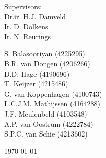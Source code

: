 \begin{titlepage}
\begin{center}
Supervisors: \\[0.2cm]
Dr.ir. H.J. Damveld \\
Ir. D. Dolkens \\
Ir. N. Reurings \\

\vspace{0.8cm}
\begin{multicols}{2}
	S. Balasooriyan (4225295) \\ B.R. van Dongen (4206266)\\ D.D. Hage (4190696)\\ T. Keijzer (4215486) \\ G. van Koppenhagen (4100743)\\
	L.C.J.M. Mathijssen (4164288) \\ J.F. Meulenbeld (4103548) \\ A.P. van Oostrum (4222784) \\ S.P.C. van Schie (4213602) \\
	\enlargethispage{15mm} \vspace{20mm}
\end{multicols}

\vfill

\begin{large}\today \end{large}

\end{center}
\end{titlepage}
